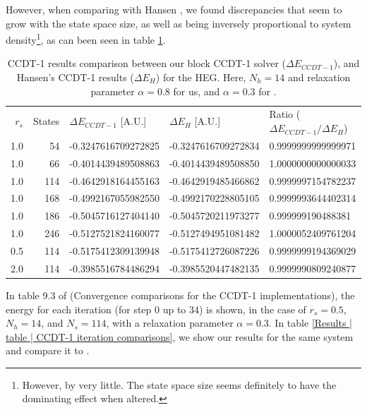 \documentclass[10pt,twoside]{report}
\begin{document}
	However, when comparing with Hansen \cite{Hansen15}, we found discrepancies that seem to grow with the state space size, as well as being inversely proportional to system density\footnote{However, by very little. The state space size seems definitely to have the dominating effect when altered.}, as can been seen in table \ref{Implementation | table | "CCDT-1 benchmarks comparisons"}.
	
	\begin{table}[h]
		\centering
		\captionsetup{width=.8\textwidth}
		\caption{CCDT-1 results comparison between our block CCDT-1 solver ($\Delta E_{CCDT-1}$), and Hansen's CCDT-1 results ($\Delta E_{H}$) \cite{Hansen15} for the HEG. Here, $N_h=14$ and relaxation parameter $\alpha=0.8$ for us, and $\alpha=0.3$ for \cite{Hansen15}.}
		\begin{tabular}{rrlll}
			$r_s$ & States & $\Delta E_{CCDT-1}$ [A.U.] & $\Delta E_{H}$ [A.U.] \cite{Hansen15} & Ratio ($\Delta E_{CCDT-1}/\Delta E_{H}$)\\
			1.0 & 54 & -0.3247616709272825 & -0.3247616709272834 & 0.9999999999999971\\ 
			1.0 & 66 & -0.4014439489508863 & -0.4014439489508850 & 1.0000000000000033\\ 
			1.0 & 114 & -0.4642918164455163 & -0.4642919485466862 & 0.9999997154782237\\ 
			1.0 & 168 & -0.4992167055982550 & -0.4992170228805105 & 0.9999993644402314\\ 
			1.0 & 186 & -0.5045716127404140 & -0.5045720211973277 & 0.999999190488381\\ 
			1.0 & 246 & -0.5127521824160077 & -0.5127494951081482 & 1.0000052409761204\\ \hline
			0.5 & 114 & -0.5175412309139948 & -0.5175412726087226 & 0.9999999194369029\\ \hline
			2.0 & 114 & -0.3985516784486294 & -0.3985520447482135 & 0.9999990809240877\\ 
		\end{tabular}
		\label{Implementation | table | "CCDT-1 benchmarks comparisons"}
	\end{table}
	
	In table 9.3 of \cite{Hansen15} (Convergence comparisons for the CCDT-1 implementations), the energy for each iteration (for step 0 up to 34) is shown, in the case of $r_s=0.5$, $N_h=14$, and $N_s=114$, with a relaxation parameter $\alpha=0.3$. In table \ref{Results | table | CCDT-1 iteration comparisons}, we show our results for the same system and compare it to \cite{Hansen15}.\\
	
\end{document}
